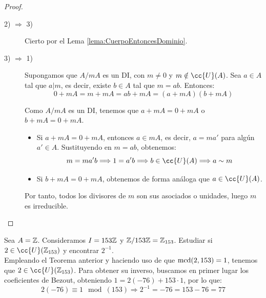 \begin{teo}
\begin{proof}
\begin{enumerate}
\begin{description}
            \item[2) $\Longrightarrow$ 3)] Cierto por el Lema \ref{lema:CuerpoEntoncesDominio}.
            \item[3) $\Longrightarrow$ 1)] Supongamos que $A/mA$ es un DI, con $m\neq 0$ y $m \notin \cc{U}(A)$. Sea $a \in A$ tal que $a|m$, es decir, existe $b \in A$ tal que $m = ab$. Entonces:
            \begin{equation*}
                0+mA = m + mA = ab + mA = (a + mA)(b + mA)
            \end{equation*}

            Como $A/mA$ es un DI, tenemos que $a + mA = 0 + mA$ o $b + mA = 0 + mA$.
            \begin{itemize}
                \item Si $a + mA = 0 + mA$, entonces $a \in mA$, es decir, $a = ma'$ para algún $a' \in A$. Sustituyendo en $m = ab$, obtenemos:
                \begin{equation*}
                    m = ma'b \Longrightarrow 1 = a'b \Longrightarrow b \in \cc{U}(A) \Longrightarrow a \sim m
                \end{equation*}
                \item Si $b + mA = 0 + mA$, obtenemos de forma análoga que $a \in \cc{U}(A)$.
            \end{itemize}

            Por tanto, todos los divisores de $m$ son sus asociados o unidades, luego $m$ es irreducible.
        \end{description}
    \end{enumerate}
\end{proof}
\end{teo}

\begin{ejemplo}
    Sea $A=\mathbb Z$. Consideramos $I=153\mathbb Z$ y $\mathbb Z/153\mathbb Z=\mathbb Z_{153}$. Estudiar si $2 \in \cc{U}(\Z_{153})$ y encontrar $2^{-1}$.\\

    Empleando el Teorema anterior y haciendo uso de que $\operatorname{mcd}(2,153)=1$, tenemos que $2 \in \cc{U}(\Z_{153})$. Para obtener su inverso, buscamos en primer lugar los coeficientes de Bezout, obteniendo $1=2(-76)+153\cdot 1$, por lo que:
    $$2(-76)\equiv 1\mod(153) \Longrightarrow 2^{-1} = -76 = 153-76 = 77$$
\end{ejemplo}

